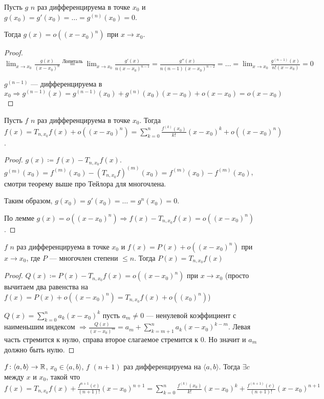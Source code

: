 \begin{lemma}
    Пусть $g$ $n$ раз дифференцируема в точке $x_0$ и $g(x_0) = g'(x_0) = \ldots = g^{(n)}(x_0) = 0$.

    Тогда $g(x) = o((x-x_0)^n)$ при $x \to x_0$.
\end{lemma}
\begin{proof}
    $\lim_{x \to x_0} \frac{g(x)}{(x-x_0)^n} \stackrel{\text{Лопиталь}}{=} \lim_{x \to x_0}\frac{g'(x)}{n(x-x_0)^{n-1}} = \frac{g''(x)}{n(n-1)(x-x_0)^{n-2}} = \ldots = \lim_{x \to x_0}\frac{g^{(n-1)}(x)}{n! (x-x_0)} = 0$ 

    $g^{(n-1)}$ --- дифференцируема в  $x_0 \Rightarrow g^{(n-1)}(x)= g^{(n-1)}(x_0)+g^{(n)}(x_0)(x - x_0) + o(x-x_0) = o(x-x_0)$ 
\end{proof}
\begin{theorem}
    Пусть $f$  $n$ раз дифференцируема в точке  $x_0$. Тогда $f(x) = T_{n, x_0}f(x) + o((x-x_0)^n) = \sum_{k=0}^n \frac{f^{(k)}(x_0)}{k!}(x-x_0)^k + o((x-x_0)^n)$.
\end{theorem}
\begin{proof}
	$g(x) \coloneqq f(x) - T_{n,x_0}f(x)$. $g^{(m)}(x_0) = f^{(m)}(x_0) - (T_{n,x_0} f)^{(m)}(x_0) = f^{(m)}(x_0) - f^{(m)}(x_0)$, смотри теорему выше про Тейлора для многочлена.

    Таким образом, $g(x_0) = g'(x_0) = \ldots = g^{n}(x_0) = 0$.

    По лемме $g(x) = o((x-x_0)^n) \Rightarrow f(x) - T_{n, x_0}f(x) = o((x - x_0)^n)$.
\end{proof}
\begin{consequence}[Единственность]
    $f$  $n$ раз дифференцируема в точке  $x_0$ и $f(x) = P(x) + o((x-x_0)^n)$ при $x\to x_0$, где $P$ --- многочлен степени $\le n$. Тогда $P(x) = T_{n,x_0}f(x)$ 
\end{consequence}
\begin{proof}
	$Q(x) \coloneqq P(x) - T_{n, x_0}f(x) = o((x-x_0)^n)$ при $x \to x_0$ (просто вычитаем два равенства на $f(x) = P(x) + o((x-x_0)^n) = T_{n, x_0}f(x) + o((x_0)^n)$)

    $Q(x) = \sum_{k=0}^n a_k(x-x_0)^k$ пусть $a_m \neq 0$ --- ненулевой коэффициент с наименьшим индексом  $\Rightarrow \frac{Q(x)}{(x-x_0)^m} = a_m + \sum_{k=m+1}^n a_k(x-x_0)^{k-m}$. Левая часть стремится к нулю, справа второе слагаемое стремится к 0. Но значит и $a_m$ должно быть нулю.
\end{proof}
\begin{theorem}
    $f\!: \langle a, b \rangle \to \mathbb{R}$,  $x_0 \in \langle a, b \rangle$, $f$  $(n+1)$ раз дифференцируема на  $\langle a, b \rangle$. Тогда  $\exists c$ между  $x$ и  $x_0$, такой что  $f(x) = T_{n, x_0}f(x) + \frac{f^{n+1}(c)}{(n+1)!}(x-x_0)^{n+1} = \sum_{k=0}^n \frac{f^{(k)}(x_0)}{k!}(x-x_0)^k + \frac{f^{(n+1)}(c)}{(n+1)!}(x-x_0)^{n+1}$
\end{theorem}
